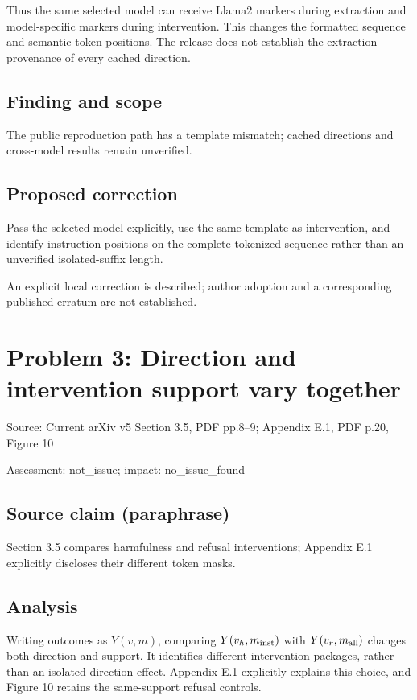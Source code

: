 \documentclass[11pt]{article}
\begin{document}
Thus the same selected model can receive Llama2 markers during extraction and model-specific markers during intervention. This changes the formatted sequence and semantic token positions. The release does not establish the extraction provenance of every cached direction.

\subsection*{Finding and scope}

The public reproduction path has a template mismatch; cached directions and cross-model results remain unverified.

\subsection*{Proposed correction}

Pass the selected model explicitly, use the same template as intervention, and identify instruction positions on the complete tokenized sequence rather than an unverified isolated-suffix length.

An explicit local correction is described; author adoption and a corresponding published erratum are not established.

\section*{Problem 3: Direction and intervention support vary together}

Source: Current arXiv v5 Section 3.5, PDF pp.8–9; Appendix E.1, PDF p.20, Figure 10

Assessment: not\_issue; impact: no\_issue\_found

\subsection*{Source claim (paraphrase)}

Section 3.5 compares harmfulness and refusal interventions; Appendix E.1 explicitly discloses their different token masks.

\subsection*{Analysis}

Writing outcomes as \(Y(v,m)\), comparing \(Y(v_h,m_{\rm inst})\) with \(Y(v_r,m_{\rm all})\) changes both direction and support. It identifies different intervention packages, rather than an isolated direction effect. Appendix E.1 explicitly explains this choice, and Figure 10 retains the same-support refusal controls.
\end{document}
